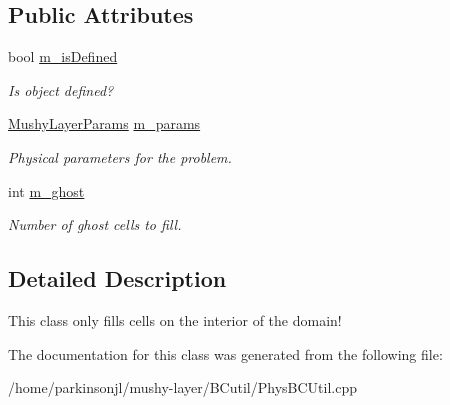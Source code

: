 \subsection*{Public Attributes}
\begin{DoxyCompactItemize}
\item 
\hypertarget{class_basic_extrap_interior_function_a5911f83345d9b3cb0ee298bc3c064e51}{bool \hyperlink{class_basic_extrap_interior_function_a5911f83345d9b3cb0ee298bc3c064e51}{m\-\_\-is\-Defined}}\label{class_basic_extrap_interior_function_a5911f83345d9b3cb0ee298bc3c064e51}

\begin{DoxyCompactList}\small\item\em Is object defined? \end{DoxyCompactList}\item 
\hypertarget{class_basic_extrap_interior_function_a2f965779be41bf4def8beb03fb734008}{\hyperlink{class_mushy_layer_params}{Mushy\-Layer\-Params} \hyperlink{class_basic_extrap_interior_function_a2f965779be41bf4def8beb03fb734008}{m\-\_\-params}}\label{class_basic_extrap_interior_function_a2f965779be41bf4def8beb03fb734008}

\begin{DoxyCompactList}\small\item\em Physical parameters for the problem. \end{DoxyCompactList}\item 
\hypertarget{class_basic_extrap_interior_function_a3b76f37832a33939ce6b5a83b73648e0}{int \hyperlink{class_basic_extrap_interior_function_a3b76f37832a33939ce6b5a83b73648e0}{m\-\_\-ghost}}\label{class_basic_extrap_interior_function_a3b76f37832a33939ce6b5a83b73648e0}

\begin{DoxyCompactList}\small\item\em Number of ghost cells to fill. \end{DoxyCompactList}\end{DoxyCompactItemize}


\subsection{Detailed Description}
This class only fills cells on the interior of the domain! 

The documentation for this class was generated from the following file\-:\begin{DoxyCompactItemize}
\item 
/home/parkinsonjl/mushy-\/layer/\-B\-Cutil/Phys\-B\-C\-Util.\-cpp\end{DoxyCompactItemize}
